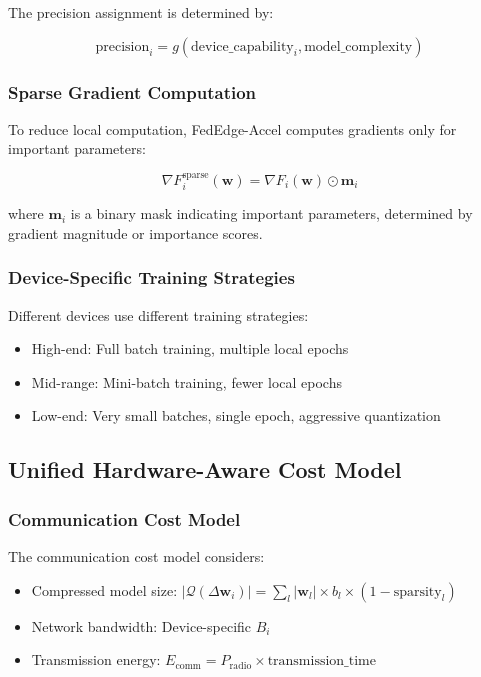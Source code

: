 \documentclass[journal]{IEEEtran}
\begin{document}
The precision assignment is determined by:

\begin{equation}
\text{precision}_i = g(\text{device\_capability}_i, \text{model\_complexity})
\label{eq:precision_assignment}
\end{equation}

\subsubsection{Sparse Gradient Computation}

To reduce local computation, FedEdge-Accel computes gradients only for important parameters:

\begin{equation}
\nabla F_i^{\text{sparse}}(\mathbf{w}) = \nabla F_i(\mathbf{w}) \odot \mathbf{m}_i
\label{eq:sparse_gradient}
\end{equation}

where $\mathbf{m}_i$ is a binary mask indicating important parameters, determined by gradient magnitude or importance scores.

\subsubsection{Device-Specific Training Strategies}

Different devices use different training strategies:
\begin{itemize}
    \item High-end: Full batch training, multiple local epochs
    \item Mid-range: Mini-batch training, fewer local epochs
    \item Low-end: Very small batches, single epoch, aggressive quantization
\end{itemize}

\subsection{Unified Hardware-Aware Cost Model}

\subsubsection{Communication Cost Model}

The communication cost model considers:
\begin{itemize}
    \item Compressed model size: $|\mathcal{Q}(\Delta\mathbf{w}_i)| = \sum_l |\mathbf{w}_l| \times b_l \times (1 - \text{sparsity}_l)$
    \item Network bandwidth: Device-specific $B_i$
    \item Transmission energy: $E_{\text{comm}} = P_{\text{radio}} \times \text{transmission\_time}$
\end{itemize}
\end{document}
